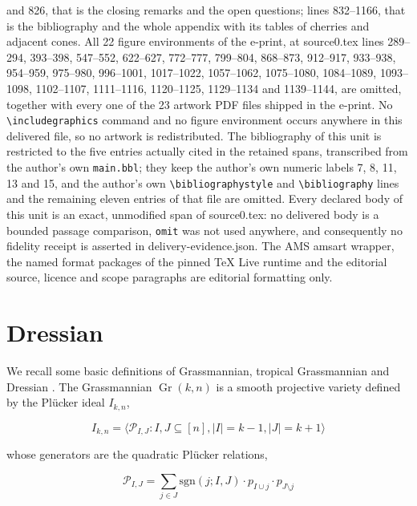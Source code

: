 \documentclass[10pt,a4paper]{amsart}
\DeclareMathOperator{\Gr}{Gr}
\theoremstyle{plain}
\theoremstyle{definition}
\numberwithin{subcase}{case}
\begin{document}
and 826, that is the closing remarks and the open questions; lines 832--1166, that is the bibliography and the whole appendix with its tables of cherries and adjacent cones. All 22 figure environments of the e-print, at source0.tex lines 289--294, 393--398, 547--552, 622--627, 772--777, 799--804, 868--873, 912--917, 933--938, 954--959, 975--980, 996--1001, 1017--1022, 1057--1062, 1075--1080, 1084--1089, 1093--1098, 1102--1107, 1111--1116, 1120--1125, 1129--1134 and 1139--1144, are omitted, together with every one of the 23 artwork PDF files shipped in the e-print. No \texttt{\textbackslash includegraphics} command and no figure environment occurs anywhere in this delivered file, so no artwork is redistributed. The bibliography of this unit is restricted to the five entries actually cited in the retained spans, transcribed from the author's own \texttt{main.bbl}; they keep the author's own numeric labels 7, 8, 11, 13 and 15, and the author's own \texttt{\textbackslash bibliographystyle} and \texttt{\textbackslash bibliography} lines and the remaining eleven entries of that file are omitted. Every declared body of this unit is an exact, unmodified span of source0.tex: no delivered body is a bounded passage comparison, \texttt{omit} was not used anywhere, and consequently no fidelity receipt is asserted in delivery-evidence.json. The AMS amsart wrapper, the named format packages of the pinned TeX Live runtime and the editorial source, licence and scope paragraphs are editorial formatting only.
\par\smallskip
\section{Dressian}\label{sec:Section_2}


We recall some basic definitions of Grassmannian, tropical Grassmannian and Dressian \cite{maclagan2021}.
The Grassmannian $\Gr(k,n)$ is a smooth projective variety defined by the Pl\"ucker ideal $I_{k,n}$,

\[ I _{k,n} = \langle  \mathcal{P}_{I,J} : I,J \subseteq [n], |I| = k-1, |J| = k+1 \rangle  \]

whose generators are the quadratic Pl\"ucker relations,

\[ \mathcal{P}_{I,J} = \sum_{j \in J} \text{sgn}(j;I,J) \cdot p_{I \cup j} \cdot p_{J \setminus j }  \]
\end{document}
